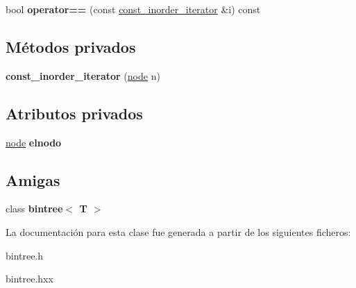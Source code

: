 \begin{DoxyCompactItemize}
\item 
\hypertarget{classbintree_1_1const__inorder__iterator_ab72bbbdbcc4cbc2a4aa41b68c3f36902}{}bool {\bfseries operator==} (const \hyperlink{classbintree_1_1const__inorder__iterator}{const\+\_\+inorder\+\_\+iterator} \&i) const \label{classbintree_1_1const__inorder__iterator_ab72bbbdbcc4cbc2a4aa41b68c3f36902}

\end{DoxyCompactItemize}
\subsection*{Métodos privados}
\begin{DoxyCompactItemize}
\item 
\hypertarget{classbintree_1_1const__inorder__iterator_a84c2d3c4f0deaae20172042b96ed3b5a}{}{\bfseries const\+\_\+inorder\+\_\+iterator} (\hyperlink{classbintree_1_1node}{node} n)\label{classbintree_1_1const__inorder__iterator_a84c2d3c4f0deaae20172042b96ed3b5a}

\end{DoxyCompactItemize}
\subsection*{Atributos privados}
\begin{DoxyCompactItemize}
\item 
\hypertarget{classbintree_1_1const__inorder__iterator_a26a6a93f42a566f54cd28941de4dfa1e}{}\hyperlink{classbintree_1_1node}{node} {\bfseries elnodo}\label{classbintree_1_1const__inorder__iterator_a26a6a93f42a566f54cd28941de4dfa1e}

\end{DoxyCompactItemize}
\subsection*{Amigas}
\begin{DoxyCompactItemize}
\item 
\hypertarget{classbintree_1_1const__inorder__iterator_a300e602ae13bd21fa092c5a5899e9eda}{}class {\bfseries bintree$<$ T $>$}\label{classbintree_1_1const__inorder__iterator_a300e602ae13bd21fa092c5a5899e9eda}

\end{DoxyCompactItemize}


La documentación para esta clase fue generada a partir de los siguientes ficheros\+:\begin{DoxyCompactItemize}
\item 
bintree.\+h\item 
bintree.\+hxx\end{DoxyCompactItemize}
